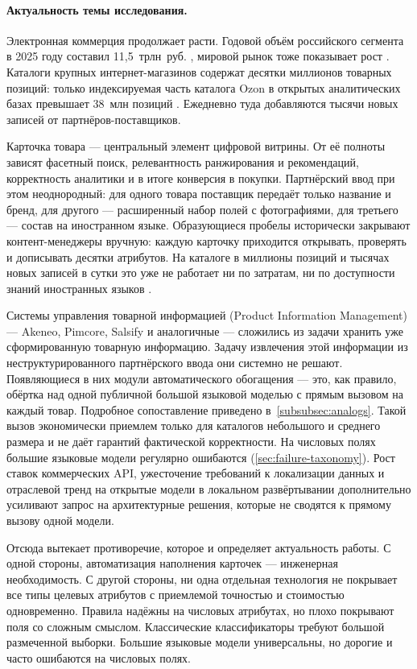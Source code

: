 \introduction

\paragraph*{Актуальность темы исследования.}

Электронная коммерция продолжает расти. Годовой объём российского сегмента в 2025 году составил 11,5~трлн~руб. \cite{ref_1}, мировой рынок тоже показывает рост \cite{ref_2}. Каталоги крупных интернет-магазинов содержат десятки миллионов товарных позиций: только индексируемая часть каталога Ozon в открытых аналитических базах превышает 38~млн позиций \cite{ref_3}. Ежедневно туда добавляются тысячи новых записей от партнёров-поставщиков.

Карточка товара — центральный элемент цифровой витрины. От её полноты зависят фасетный поиск, релевантность ранжирования и рекомендаций, корректность аналитики и в итоге конверсия в покупки. Партнёрский ввод при этом неоднородный: для одного товара поставщик передаёт только название и бренд, для другого — расширенный набор полей с фотографиями, для третьего — состав на иностранном языке. Образующиеся пробелы исторически закрывают контент-менеджеры вручную: каждую карточку приходится открывать, проверять и дописывать десятки атрибутов. На каталоге в миллионы позиций и тысячах новых записей в сутки это уже не работает ни по затратам, ни по доступности знаний иностранных языков \cite{ref_4}.

Системы управления товарной информацией (Product Information Management) — Akeneo, Pimcore, Salsify и аналогичные \cite{ref_5, ref_6, ref_7} — сложились из задачи хранить уже сформированную товарную информацию. Задачу извлечения этой информации из неструктурированного партнёрского ввода они системно не решают. Появляющиеся в них модули автоматического обогащения — это, как правило, обёртка над одной публичной большой языковой моделью с прямым вызовом на каждый товар. Подробное сопоставление приведено в~\ref{subsubsec:analogs}. Такой вызов экономически приемлем только для каталогов небольшого и среднего размера и не даёт гарантий фактической корректности. На числовых полях большие языковые модели регулярно ошибаются (\ref{sec:failure-taxonomy}). Рост ставок коммерческих API, ужесточение требований к локализации данных и отраслевой тренд на открытые модели в локальном развёртывании \cite{ref_8} дополнительно усиливают запрос на архитектурные решения, которые не сводятся к прямому вызову одной модели.

Отсюда вытекает противоречие, которое и определяет актуальность работы. С одной стороны, автоматизация наполнения карточек — инженерная необходимость. С другой стороны, ни одна отдельная технология не покрывает все типы целевых атрибутов с приемлемой точностью и стоимостью одновременно. Правила надёжны на числовых атрибутах, но плохо покрывают поля со сложным смыслом. Классические классификаторы требуют большой размеченной выборки. Большие языковые модели универсальны, но дорогие и часто ошибаются на числовых полях.

